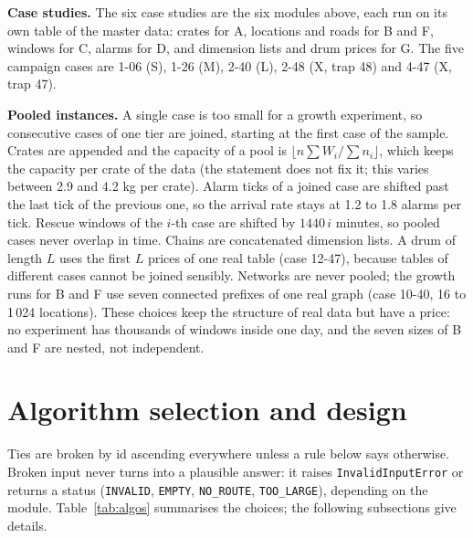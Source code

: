 \documentclass[11pt,a4paper]{article}
\newcommand{\cs}[1]{\texttt{#1}}
\begin{document}
\textbf{Case studies.} The six case studies are the six modules above, each run on its own table of the master data: crates for A, locations and roads for B and F, windows for C, alarms for D, and dimension lists and drum prices for G.
The five campaign cases are 1-06 (S), 1-26 (M), 2-40 (L), 2-48 (X, trap 48) and 4-47 (X, trap 47).

\textbf{Pooled instances.} A single case is too small for a growth experiment, so consecutive cases of one tier are joined, starting at the first case of the sample.
Crates are appended and the capacity of a pool is $\lfloor n\sum W_i / \sum n_i\rfloor$, which keeps the capacity per crate of the data (the statement does not fix it; this varies between 2.9 and 4.2 kg per crate).
Alarm ticks of a joined case are shifted past the last tick of the previous one, so the arrival rate stays at 1.2 to 1.8 alarms per tick. Rescue windows of the $i$-th case are shifted by $1440\,i$ minutes, so pooled cases never overlap in time.
Chains are concatenated dimension lists. A drum of length $L$ uses the first $L$ prices of one real table (case 12-47), because tables of different cases cannot be joined sensibly. Networks are never pooled; the growth runs for B and F use seven connected prefixes of one real graph (case 10-40, 16 to 1\,024 locations).
These choices keep the structure of real data but have a price: no experiment has thousands of windows inside one day, and the seven sizes of B and F are nested, not independent.

\section{Algorithm selection and design}\label{sec:algo}
Ties are broken by id ascending everywhere unless a rule below says otherwise. Broken input never turns into a plausible answer: it raises \cs{InvalidInputError} or returns a status (\cs{INVALID}, \cs{EMPTY}, \cs{NO\_ROUTE}, \cs{TOO\_LARGE}), depending on the module.
Table~\ref{tab:algos} summarises the choices; the following subsections give details.
\end{document}
